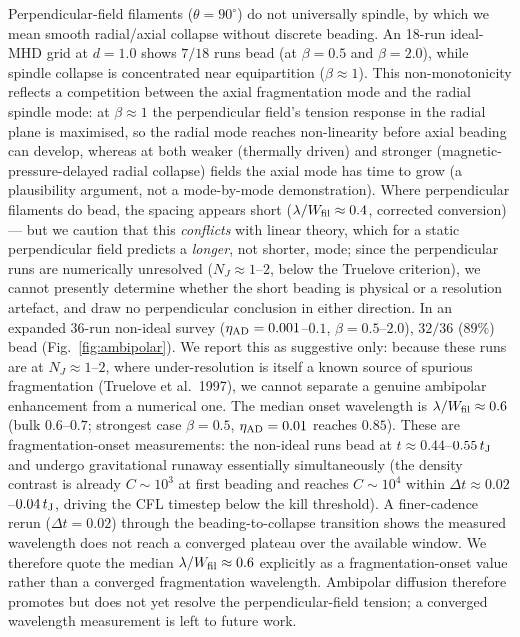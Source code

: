 \documentclass[usenatbib,twoside,twocolumn]{mnras}
\begin{document}
Perpendicular-field filaments ($\theta=90^\circ$) do not universally spindle, by which we mean smooth radial/axial collapse without discrete beading. An 18-run ideal-MHD grid at $d=1.0$ shows $7/18$ runs bead (at $\beta=0.5$ and $\beta=2.0$), while spindle collapse is concentrated near equipartition ($\beta\approx1$). This non-monotonicity reflects a competition between the axial fragmentation mode and the radial spindle mode: at $\beta\approx1$ the perpendicular field's tension response in the radial plane is maximised, so the radial mode reaches non-linearity before axial beading can develop, whereas at both weaker (thermally driven) and stronger (magnetic-pressure-delayed radial collapse) fields the axial mode has time to grow (a plausibility argument, not a mode-by-mode demonstration). Where perpendicular filaments do bead, the spacing appears short ($\lambda/W_{\rm fil}\approx0.4$, corrected conversion) --- but we caution that this \emph{conflicts} with linear theory, which for a static perpendicular field predicts a \emph{longer}, not shorter, mode; since the perpendicular runs are numerically unresolved ($N_J\approx1$--$2$, below the Truelove criterion), we cannot presently determine whether the short beading is physical or a resolution artefact, and draw no perpendicular conclusion in either direction. In an expanded 36-run non-ideal survey ($\eta_{\rm AD}=0.001$--$0.1$, $\beta=0.5$--$2.0$), $32/36$ ($89\%$) bead (Fig.~\ref{fig:ambipolar}). We report this as suggestive only: because these runs are at $N_J\approx1$--$2$, where under-resolution is itself a known source of spurious fragmentation (Truelove et al.\ 1997), we cannot separate a genuine ambipolar enhancement from a numerical one. The median onset wavelength is $\lambda/W_{\rm fil}\approx0.6$ (bulk $0.6$--$0.7$; strongest case $\beta=0.5$, $\eta_{\rm AD}=0.01$ reaches $0.85$). These are fragmentation-onset measurements: the non-ideal runs bead at $t\approx0.44$--$0.55\,t_{\rm J}$ and undergo gravitational runaway essentially simultaneously (the density contrast is already $C\sim10^3$ at first beading and reaches $C\sim10^4$ within $\Delta t\approx0.02$--$0.04\,t_{\rm J}$, driving the CFL timestep below the kill threshold). A finer-cadence rerun ($\Delta t=0.02$) through the beading-to-collapse transition shows the measured wavelength does not reach a converged plateau over the available window. We therefore quote the median $\lambda/W_{\rm fil}\approx0.6$ explicitly as a fragmentation-onset value rather than a converged fragmentation wavelength. Ambipolar diffusion therefore promotes but does not yet resolve the perpendicular-field tension; a converged wavelength measurement is left to future work.
\end{document}

